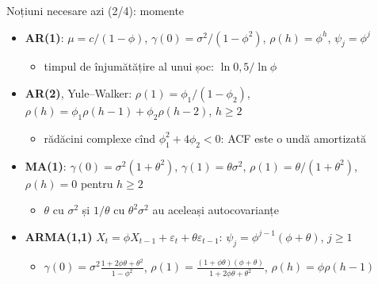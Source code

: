\begin{frame}{Noțiuni necesare azi (2/4): momente}
\itemsize{\small}
\begin{itemize}
    \item \textbf{AR(1)}: $\mu = c/(1 - \phi)$, $\gamma(0) = \sigma^2/(1 - \phi^2)$, $\rho(h) = \phi^h$, $\psi_j = \phi^j$
    \begin{itemize}
        \item timpul de înjumătățire al unui șoc: $\ln 0{,}5/\ln\phi$
    \end{itemize}
    \item \textbf{AR(2)}, Yule--Walker: $\rho(1) = \phi_1/(1 - \phi_2)$, $\rho(h) = \phi_1\rho(h - 1) + \phi_2\rho(h - 2)$, $h \ge 2$
    \begin{itemize}
        \item rădăcini complexe cînd $\phi_1^2 + 4\phi_2 < 0$: ACF este o undă amortizată
    \end{itemize}
    \item \textbf{MA(1)}: $\gamma(0) = \sigma^2(1 + \theta^2)$, $\gamma(1) = \theta\sigma^2$, $\rho(1) = \theta/(1 + \theta^2)$, $\rho(h) = 0$ pentru $h \ge 2$
    \begin{itemize}
        \item $\theta$ cu $\sigma^2$ și $1/\theta$ cu $\theta^2\sigma^2$ au aceleași autocovarianțe
    \end{itemize}
    \item \textbf{ARMA(1,1)} $X_t = \phi X_{t-1} + \varepsilon_t + \theta\varepsilon_{t-1}$: $\psi_j = \phi^{j-1}(\phi + \theta)$, $j \ge 1$
    \begin{itemize}
        \item $\gamma(0) = \sigma^2\frac{1 + 2\phi\theta + \theta^2}{1 - \phi^2}$, $\rho(1) = \frac{(1 + \phi\theta)(\phi + \theta)}{1 + 2\phi\theta + \theta^2}$, $\rho(h) = \phi\rho(h - 1)$
    \end{itemize}
\end{itemize}
\end{frame}

